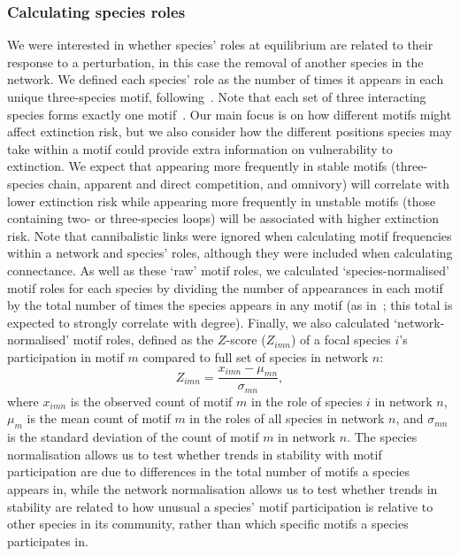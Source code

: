 \documentclass[12pt]{article}
\begin{document}
\begin{spacing}{2.0}
    
    	\subsubsection*{Calculating species roles}
    
    
    		We were interested in whether species' roles at equilibrium are related to their response to a perturbation, in this case the removal of another species in the network. We defined each species' role as the number of times it appears in each unique three-species motif, following~\citet{Stouffer2012,Cirtwill2015}. Note that each set of three interacting species forms exactly one motif~\citep{Cirtwill2018FoodWebs}. Our main focus is on how different motifs might affect extinction risk, but we also consider how the different positions species may take within a motif could provide extra information on vulnerability to extinction. We expect that appearing more frequently in stable motifs (three-species chain, apparent and direct competition, and omnivory) will correlate with lower extinction risk while appearing more frequently in unstable motifs (those containing two- or three-species loops) will be associated with higher extinction risk.	Note that cannibalistic links were ignored when calculating motif frequencies within a network and species' roles, although they were included when calculating connectance. As well as these `raw' motif roles, we calculated `species-normalised' motif roles for each species by dividing the number of appearances in each motif by the total number of times the species appears in any motif (as in~\citet{Cirtwill2015}; this total is expected to strongly correlate with degree). Finally, we also calculated `network-normalised' motif roles, defined as the $Z$-score ($Z_{imn}$) of a focal species $i$'s participation in motif $m$ compared to full set of species in network $n$:
    		\begin{equation}
    		Z_{imn} = \frac{x_{imn}-\mu_{mn}}{\sigma_{mn}} ,
    		\end{equation}
    		where $x_{imn}$ is the observed count of motif $m$ in the role of species $i$ in network $n$, $\mu_m$ is the mean count of motif $m$ in the roles of all species in network $n$, and $\sigma_{mn}$ is the standard deviation of the count of motif $m$ in network $n$.
    		The species normalisation allows us to test whether trends in stability with motif participation are due to differences in the total number of motifs a species appears in, while the network normalisation allows us to test whether trends in stability are related to how unusual a species' motif participation is relative to other species in its community, rather than which specific motifs a species participates in.
    

\end{spacing}
\end{document}
